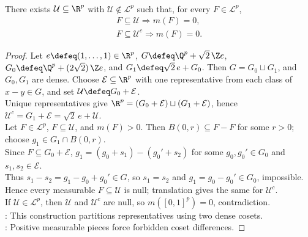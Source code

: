 \begin{theorem} \label{thm:ubiquitous-nonmeasurable-set} \\
There exists $\mathcal{U}\subseteq\R^p$ with $\mathcal{U}\notin\mathcal{L}^p$ such that, for every $F\in\mathcal{L}^p$,
\[
\begin{gathered}
F\subseteq\mathcal{U}\Longrightarrow m(F)=0,\\
F\subseteq\mathcal{U}^c\Longrightarrow m(F)=0.
\end{gathered}
\]
\begin{proof}
Let $e\defeq(1,\ldots,1)\in\R^p$, $G\defeq\Q^p+\sqrt{2}\,\Z e$, $G_0\defeq\Q^p+(2\sqrt{2})\,\Z e$, and $G_1\defeq\sqrt{2}\,e+G_0$.
Then $G=G_0\sqcup G_1$, and $G_0,G_1$ are dense. Choose $\mathcal{E}\subseteq\R^p$ with one representative from each class of $x-y\in G$, and set $\mathcal{U}\defeq G_0+\mathcal{E}$.\\
Unique representatives give $\R^p=(G_0+\mathcal{E})\sqcup(G_1+\mathcal{E})$, hence $\mathcal{U}^c=G_1+\mathcal{E}=\sqrt{2}\,e+\mathcal{U}$.\\
Let $F\in\mathcal{L}^p$, $F\subseteq\mathcal{U}$, and $m(F)>0$. Then $B(0,r)\subseteq F-F$ for some $r>0$; choose $g_1\in G_1\cap B(0,r)$.\\
Since $F\subseteq G_0+\mathcal{E}$, $g_1=(g_0+s_1)-(g_0'+s_2)$ for some $g_0,g_0'\in G_0$ and $s_1,s_2\in\mathcal{E}$.\\
Thus $s_1-s_2=g_1-g_0+g_0'\in G$, so $s_1=s_2$ and $g_1=g_0-g_0'\in G_0$, impossible.\\
Hence every measurable $F\subseteq\mathcal{U}$ is null; translation gives the same for $\mathcal{U}^c$.\\
If $\mathcal{U}\in\mathcal{L}^p$, then $\mathcal{U}$ and $\mathcal{U}^c$ are null, so $m([0,1]^p)=0$, contradiction.\\
: This construction partitions representatives using two dense cosets.\\
: Positive measurable pieces force forbidden coset differences.
\end{proof}
\end{theorem}
